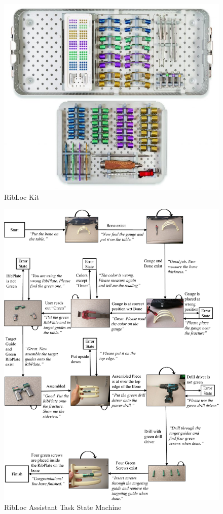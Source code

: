 \begin{figure}
\centering
\includegraphics[width=0.5\linewidth]{FIGS/RibLoc.jpg}
\caption{\small RibLoc Kit}
\label{fig:ribloc}
\end{figure}

\begin{figure}
\centering
\includegraphics[width=\linewidth]{FIGS/ribloc-fsm-crop.pdf}
\caption{\small RibLoc Assistant Task State Machine}
\label{fig:ribloc-app}
\end{figure}

